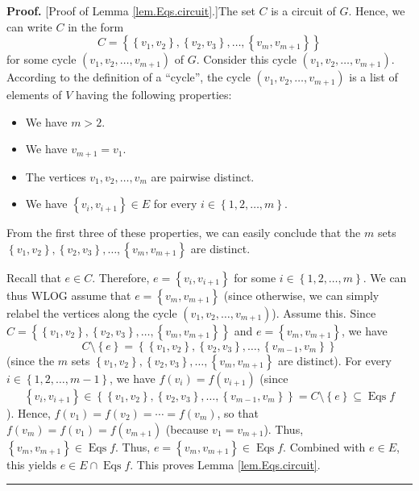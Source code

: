 \documentclass[numbers=enddot,12pt,final,onecolumn,notitlepage]{scrartcl}%
\theoremstyle{definition}
\newenvironment{proof}[1][Proof]{\noindent\textbf{#1.} }{\ \rule{0.5em}{0.5em}}
\newenvironment{vershort}{}{}
\begin{document}
\begin{vershort}
\begin{proof}
[Proof of Lemma \ref{lem.Eqs.circuit}.]The set $C$ is a circuit of $G$. Hence,
we can write $C$ in the form%
\[
C=\left\{  \left\{  v_{1},v_{2}\right\}  ,\left\{  v_{2},v_{3}\right\}
,\ldots,\left\{  v_{m},v_{m+1}\right\}  \right\}
\]
for some cycle $\left(  v_{1},v_{2},\ldots,v_{m+1}\right)  $ of $G$. Consider
this cycle $\left(  v_{1},v_{2},\ldots,v_{m+1}\right)  $. According to the
definition of a \textquotedblleft cycle\textquotedblright, the cycle $\left(
v_{1},v_{2},\ldots,v_{m+1}\right)  $ is a list of elements of $V$ having the
following properties:

\begin{itemize}
\item We have $m>2$.

\item We have $v_{m+1}=v_{1}$.

\item The vertices $v_{1},v_{2},\ldots,v_{m}$ are pairwise distinct.

\item We have $\left\{  v_{i},v_{i+1}\right\}  \in E$ for every $i\in\left\{
1,2,\ldots,m\right\}  $.
\end{itemize}

From the first three of these properties, we can easily conclude that the $m$
sets $\left\{  v_{1},v_{2}\right\}  ,\left\{  v_{2},v_{3}\right\}
,\ldots,\left\{  v_{m},v_{m+1}\right\}  $ are distinct.

Recall that $e\in C$. Therefore, $e=\left\{  v_{i},v_{i+1}\right\}  $ for some
$i\in\left\{  1,2,\ldots,m\right\}  $. We can thus WLOG assume that
$e=\left\{  v_{m},v_{m+1}\right\}  $ (since otherwise, we can simply relabel
the vertices along the cycle $\left(  v_{1},v_{2},\ldots,v_{m+1}\right)  $).
Assume this. Since $C=\left\{  \left\{  v_{1},v_{2}\right\}  ,\left\{
v_{2},v_{3}\right\}  ,\ldots,\left\{  v_{m},v_{m+1}\right\}  \right\}  $ and
$e=\left\{  v_{m},v_{m+1}\right\}  $, we have%
\[
C\setminus\left\{  e\right\}  =\left\{  \left\{  v_{1},v_{2}\right\}
,\left\{  v_{2},v_{3}\right\}  ,\ldots,\left\{  v_{m-1},v_{m}\right\}
\right\}
\]
(since the $m$ sets $\left\{  v_{1},v_{2}\right\}  ,\left\{  v_{2}%
,v_{3}\right\}  ,\ldots,\left\{  v_{m},v_{m+1}\right\}  $ are distinct). For
every $i\in\left\{  1,2,\ldots,m-1\right\}  $, we have $f\left(  v_{i}\right)
=f\left(  v_{i+1}\right)  $ (since
\[
\left\{  v_{i},v_{i+1}\right\}  \in\left\{  \left\{  v_{1},v_{2}\right\}
,\left\{  v_{2},v_{3}\right\}  ,\ldots,\left\{  v_{m-1},v_{m}\right\}
\right\}  =C\setminus\left\{  e\right\}  \subseteq\operatorname*{Eqs}f
\]
). Hence, $f\left(  v_{1}\right)  =f\left(  v_{2}\right)  =\cdots=f\left(
v_{m}\right)  $, so that $f\left(  v_{m}\right)  =f\left(  v_{1}\right)
=f\left(  v_{m+1}\right)  $ (because $v_{1}=v_{m+1}$). Thus, $\left\{
v_{m},v_{m+1}\right\}  \in\operatorname*{Eqs}f$. Thus, $e=\left\{
v_{m},v_{m+1}\right\}  \in\operatorname*{Eqs}f$. Combined with $e\in E$, this
yields $e\in E\cap\operatorname*{Eqs}f$. This proves Lemma
\ref{lem.Eqs.circuit}.
\end{proof}
\end{vershort}
\end{document}
